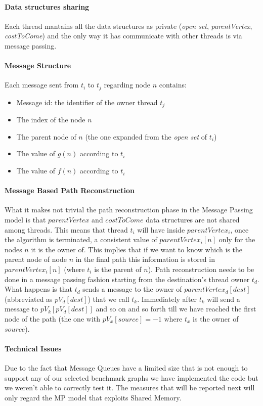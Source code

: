 \documentclass[twocolumn, switch]{article} %
\begin{document}
\paragraph{Data structures sharing}
Each thread mantains all the data structures as private (\textit{open set},
\textit{parentVertex}, \textit{costToCome}) and the only way it has communicate with other threads
is via message passing.
\paragraph{Message Structure} Each message sent from $t_i$ to $t_j$ regarding node $n$ contains:
\begin{itemize}
  \item Message id: the identifier of the owner thread $t_j$
  \item The index of the node $n$
  \item The parent node of $n$ (the one expanded from the \textit{open set} of $t_i$)
  \item The value of $g(n)$ according to $t_i$
  \item The value of $f(n)$ according to $t_i$
\end{itemize}
\paragraph{Message Based Path Reconstruction}
What it makes not trivial the path reconstruction phase in the Message Passing model
is that $parentVertex$ and $costToCome$ data structures are not shared among threads. 
This means that thread $t_i$ will have inside $parentVertex_i$, once the algorithm is terminated, 
a consistent value of $parentVertex_i[n]$ only for the nodes $n$ it is the owner of. This implies that if
we want to know which is the parent node of node $n$ in the final path this information
is stored in $parentVertex_i[n]$ (where $t_i$ is the parent of $n$). Path reconstruction needs to be done in a message passing fashion starting
from the destination's thread owner $t_d$. What happens is that $t_d$ sends a message to
the owner of $parentVertex_d[dest]$ (abbreviated as $pV_d[dest]$) that we call $t_k$. Immediately after $t_k$ will send a message
to $pV_k[pV_d[dest]]$ and so on and so forth till we have reached the first node of the path (the one with $pV_x[source] = -1$ where
$t_x$ is the owner of $source$).
\paragraph{Technical Issues}
Due to the fact that Message Queues have a limited size that is not enough to support any of our
selected benchmark graphs we have implemented the code but we weren't able to correctly test it. The
measures that will be reported next will only regard the MP model that exploits Shared Memory. 
\end{document}
